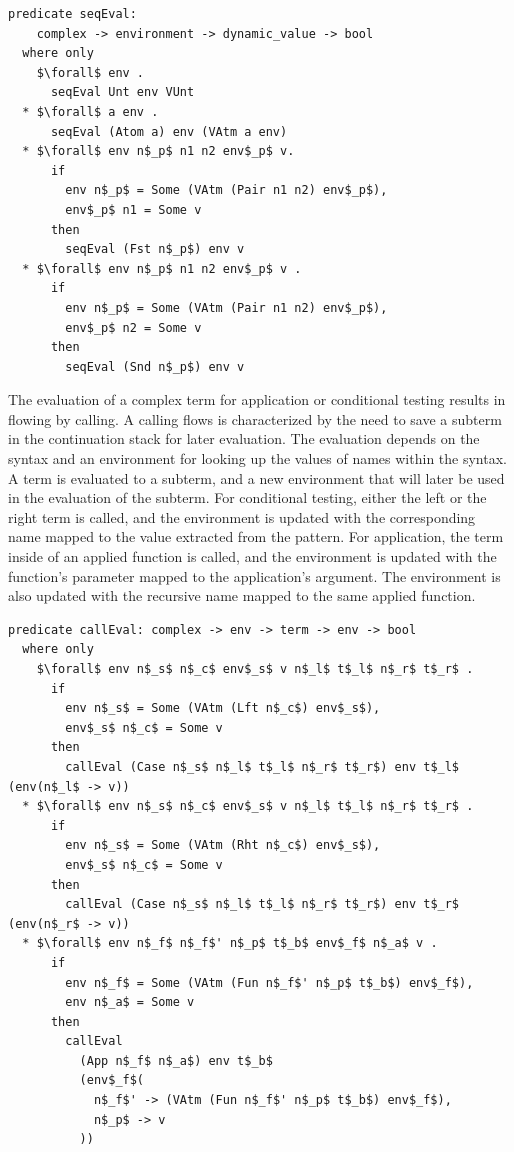 \documentclass[letterpaper, 11pt]{extarticle}
\begin{document}
\begin{lstlisting}[language=logic, mathescape]
  predicate seqEval:
    complex -> environment -> dynamic_value -> bool
  where only
    $\forall$ env . 
      seqEval Unt env VUnt
  * $\forall$ a env .
      seqEval (Atom a) env (VAtm a env)
  * $\forall$ env n$_p$ n1 n2 env$_p$ v. 
      if
        env n$_p$ = Some (VAtm (Pair n1 n2) env$_p$),
        env$_p$ n1 = Some v
      then
        seqEval (Fst n$_p$) env v
  * $\forall$ env n$_p$ n1 n2 env$_p$ v . 
      if
        env n$_p$ = Some (VAtm (Pair n1 n2) env$_p$), 
        env$_p$ n2 = Some v 
      then
        seqEval (Snd n$_p$) env v
\end{lstlisting}

The evaluation of a complex term for application or conditional testing
results in flowing by calling. A calling flows is characterized
by the need to save a subterm in the continuation stack for later evaluation.
The evaluation depends on the syntax
and an environment for looking up the values of names within the syntax.
A term is evaluated to a subterm, and a new environment that will
later be used in the evaluation of the subterm. For conditional testing, either the left or the right
term is called, and the environment is updated with the corresponding name mapped to the
value extracted from the pattern. For application, the term inside of an applied function 
is called, and the environment is updated with the function's parameter mapped to the
application's argument. The environment is also updated with the recursive name mapped to the
same applied function.

\begin{lstlisting}[language=logic, mathescape]
  predicate callEval: complex -> env -> term -> env -> bool
  where only
    $\forall$ env n$_s$ n$_c$ env$_s$ v n$_l$ t$_l$ n$_r$ t$_r$ .
      if
        env n$_s$ = Some (VAtm (Lft n$_c$) env$_s$),
        env$_s$ n$_c$ = Some v
      then
        callEval (Case n$_s$ n$_l$ t$_l$ n$_r$ t$_r$) env t$_l$ (env(n$_l$ -> v))
  * $\forall$ env n$_s$ n$_c$ env$_s$ v n$_l$ t$_l$ n$_r$ t$_r$ .
      if 
        env n$_s$ = Some (VAtm (Rht n$_c$) env$_s$),
        env$_s$ n$_c$ = Some v
      then
        callEval (Case n$_s$ n$_l$ t$_l$ n$_r$ t$_r$) env t$_r$ (env(n$_r$ -> v))
  * $\forall$ env n$_f$ n$_f$' n$_p$ t$_b$ env$_f$ n$_a$ v .
      if 
        env n$_f$ = Some (VAtm (Fun n$_f$' n$_p$ t$_b$) env$_f$),
        env n$_a$ = Some v
      then
        callEval
          (App n$_f$ n$_a$) env t$_b$
          (env$_f$(
            n$_f$' -> (VAtm (Fun n$_f$' n$_p$ t$_b$) env$_f$),
            n$_p$ -> v
          ))
\end{lstlisting}
  
\end{document}
